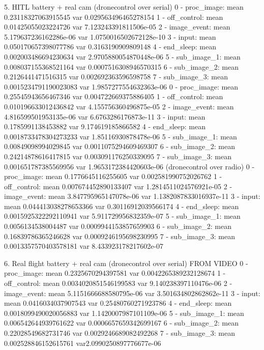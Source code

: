 5. HITL battery + real cam 
        (dronecontrol over serial)
0 - proc_image: mean 0.23118327063915545 var 0.029563496465278154
1 - off_control: mean 0.01425055023224726 var 7.123243391811506e-05
2 - image_event: mean 5.179637236162286e-06 var 1.0750016502672128e-10
3 - input: mean 0.050170657398077786 var 0.3163190909809148
4 - end_sleep: mean 0.002003486694230634 var 2.9705880054870448e-06
5 - sub_image_1: mean 0.008037155368521164 var 0.0007516308946570315
6 - sub_image_2: mean 0.2126441471516315 var 0.002692363596598758
7 - sub_image_3: mean 0.0015234791190023083 var 1.9857277554632363e-06
0 - proc_image: mean 0.25545943656467346 var 0.004722669375886405
1 - off_control: mean 0.010196633012436842 var 4.155756360496875e-05
2 - image_event: mean 4.816599501953135e-06 var 6.6763286176873e-11
3 - input: mean 0.1785991138453882 var 9.174619185866582
4 - end_sleep: mean 0.0018733478304273233 var 1.85116930878478e-06
5 - sub_image_1: mean 0.00849098994029845 var 0.0011075294609469307
6 - sub_image_2: mean 0.24214878616417815 var 0.003091176250339095
7 - sub_image_3: mean 0.001651787385569956 var 1.9653172384420603e-06
         (dronecontrol over radio)
0 - proc_image: mean 0.1776645116255605 var 0.002581990752026762
1 - off_control: mean 0.007674452890133407 var 1.2814511024576921e-05
2 - image_event: mean 3.847795965147078e-06 var 1.1382087833016937e-11
3 - input: mean 0.044413038278653366 var 0.30116912039566174
4 - end_sleep: mean 0.0015925322292110941 var 5.911729956832359e-07
5 - sub_image_1: mean 0.0056134538004487 var 0.0009944153857659903
6 - sub_image_2: mean 0.16839786365246628 var 0.0009246195698230995
7 - sub_image_3: mean 0.0013357570403578181 var 8.433923178217602e-07



6. Real flight battery + real cam (dronecontrol over serial)
FROM VIDEO
0 - proc_image: mean 0.2325670294397581 var 0.0042265389232128674
1 - off_control: mean 0.0034020851546199583 var 9.140238397110476e-06
2 - image_event: mean 5.1151666688580795e-06 var 3.501634802862862e-11
3 - input: mean 0.0416034037907543 var 0.25480760271923786
4 - end_sleep: mean 0.0018099490020056883 var 1.1420007987101109e-06
5 - sub_image_1: mean 0.006542644939761622 var 0.0006657659342699167
6 - sub_image_2: mean 0.22028549682731746 var 0.0029246689082492268
7 - sub_image_3: mean 0.002528846152615761 var2.0990250897776677e-06